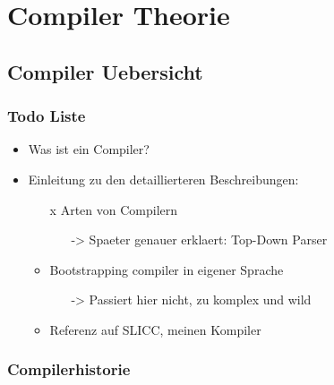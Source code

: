 \part{Compiler Theorie}
\chapter{Compiler Uebersicht}
\label{chap:theory:compilerHistory}

\section{Todo Liste}

\begin{itemize}
  \item Was ist ein Compiler?
  \item Einleitung zu den detaillierteren Beschreibungen:
  \begin{itemize}
    \item [x] Arten von Compilern 
    \begin{itemize}
    \item[->] Spaeter genauer erklaert: Top-Down Parser
    \end{itemize}
    \item Bootstrapping compiler in eigener Sprache
    \begin{itemize}
      \item[->] Passiert hier nicht, zu komplex und wild
    \end{itemize}
    \item Referenz auf SLICC, meinen Kompiler
  \end{itemize}
\end{itemize}


\section{Compilerhistorie}

